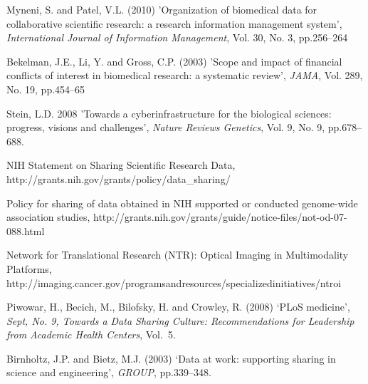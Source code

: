 \documentclass{doublecol-new}
\theoremstyle{TH}{
\newtheorem{lemma}{Lemma}
\newtheorem{theorem}[lemma]{Theorem}
\newtheorem{corrolary}[lemma]{Corrolary}
\newtheorem{conjecture}[lemma]{Conjecture}
\newtheorem{proposition}[lemma]{Proposition}
\newtheorem{claim}[lemma]{Claim}
\newtheorem{stheorem}[lemma]{Wrong Theorem}
\newtheorem{algorithm}{Algorithm}
}
\theoremstyle{THrm}{
\newtheorem{definition}{Definition}[section]
\newtheorem{question}{Question}[section]
\newtheorem{remark}{Remark}
\newtheorem{scheme}{Scheme}
}
\theoremstyle{THhit}{
\newtheorem{case}{Case}[section]
}
\begin{document}
\begin{thebibliography}{10}

Myneni, S. and  Patel, V.L. (2010) 'Organization of biomedical data
for collaborative scientific research: a research information
management system', {\it International Journal of Information
Management}, Vol. 30, No. 3, pp.256--264

Bekelman, J.E., Li, Y. and Gross, C.P. (2003) 'Scope and impact of
financial conflicts of interest in biomedical research: a systematic
review', {\it JAMA}, Vol. 289, No. 19, pp.454--65

Stein, L.D. {2008} 'Towards a cyberinfrastructure for the biological
sciences: progress, visions and challenges', {\it Nature Reviews
Genetics}, Vol. 9, No. 9, pp.678--688.

NIH Statement on Sharing Scientific Research Data,
http://grants.nih.gov/grants/policy/data\_sharing/

 Policy for
sharing of data obtained in NIH supported or conducted genome-wide
association studies,
http://grants.nih.gov/grants/guide/notice-files/not-od-07-088.html

 Network for Translational Research
(NTR): Optical Imaging in Multimodality Platforms,
http://imaging.cancer.gov/programsandresources/specializedinitiatives/ntroi

Piwowar, H., Becich, M., Bilofsky, H. and Crowley, R. (2008) `PLoS
medicine', {\it Sept, No. 9, Towards a Data Sharing Culture:
Recommendations for Leadership from Academic Health Centers},
Vol.~5.

Birnholtz, J.P. and Bietz, M.J. (2003) `Data at work: supporting
sharing in science and engineering', {\it GROUP}, pp.339--348.


\end{thebibliography}
\end{document}
